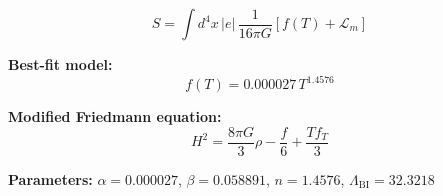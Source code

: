 
\begin{equation}
  S = \int d^4x \, |e| \, \frac{1}{16\pi G} \left[ f(T) + \mathcal{L}_m \right]
\end{equation}

\textbf{Best-fit model:}
\begin{equation}
  f(T) = 0.000027 \, T^{1.4576}
\end{equation}

\textbf{Modified Friedmann equation:}
\begin{equation}
  H^2 = \frac{8\pi G}{3} \rho - \frac{f}{6} + \frac{T f_T}{3}
\end{equation}

\textbf{Parameters:}
$\alpha = 0.000027$, \quad
$\beta = 0.058891$, \quad
$n = 1.4576$, \quad
$\Lambda_{\text{BI}} = 32.3218$